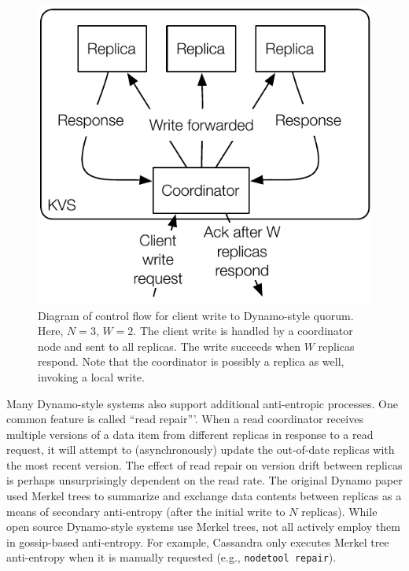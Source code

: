\documentclass{vldb}
\begin{document}
\begin{figure}
\centering
\includegraphics[width=.8\columnwidth]{figs/dynamo-quorum.pdf}
\caption{Diagram of control flow for client write to Dynamo-style
  quorum.  Here, $N=3$, $W=2$. The client write is handled by a
  coordinator node and sent to all replicas. The write succeeds when
  $W$ replicas respond.  Note that the coordinator is possibly a
  replica as well, invoking a local write.}
\label{fig:dynamo-quorum}
\end{figure}

Many Dynamo-style systems also support additional anti-entropic
processes.  One common feature is called ``read repair'''.  When a
read coordinator receives multiple versions of a data item from
different replicas in response to a read request, it will attempt to
(asynchronously) update the out-of-date replicas with the most recent
version.  The effect of read repair on version drift between replicas
is perhaps unsurprisingly dependent on the read rate.  The original
Dynamo paper used Merkel trees to summarize and exchange data contents
between replicas as a means of secondary anti-entropy (after the
initial write to $N$ replicas).  While open source Dynamo-style
systems use Merkel trees, not all actively employ them in gossip-based
anti-entropy.  For example, Cassandra only executes Merkel tree
anti-entropy when it is manually requested (e.g., \texttt{nodetool
  repair}).

\end{document}
